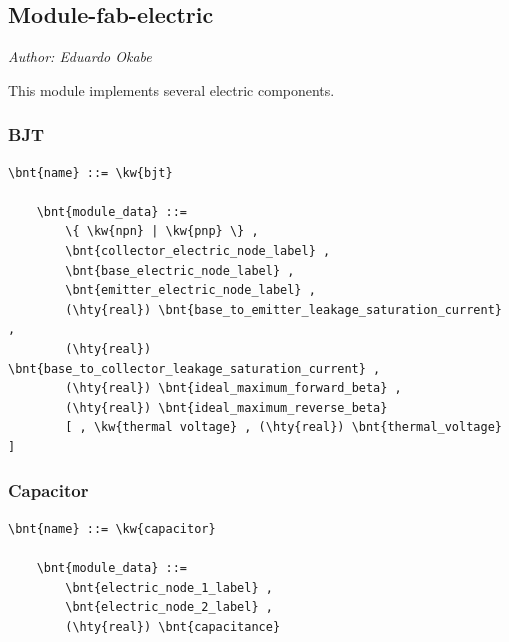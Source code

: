 % 
% 
% 
% 
% 
% 
% 
% 
% 


\subsection{Module-fab-electric}
\label{sec:MODULE:FAB-ELECTRIC}
\emph{Author: Eduardo Okabe}

\noindent
This module implements several electric components.


\subsubsection{BJT}
\begin{Verbatim}[commandchars=\\\{\}]
    \bnt{name} ::= \kw{bjt}

    \bnt{module_data} ::=
        \{ \kw{npn} | \kw{pnp} \} ,
        \bnt{collector_electric_node_label} ,
        \bnt{base_electric_node_label} ,
        \bnt{emitter_electric_node_label} ,
        (\hty{real}) \bnt{base_to_emitter_leakage_saturation_current} ,
        (\hty{real}) \bnt{base_to_collector_leakage_saturation_current} ,
        (\hty{real}) \bnt{ideal_maximum_forward_beta} ,
        (\hty{real}) \bnt{ideal_maximum_reverse_beta}
        [ , \kw{thermal voltage} , (\hty{real}) \bnt{thermal_voltage} ]
\end{Verbatim}


\subsubsection{Capacitor}
\begin{Verbatim}[commandchars=\\\{\}]
    \bnt{name} ::= \kw{capacitor}

    \bnt{module_data} ::=
        \bnt{electric_node_1_label} ,
        \bnt{electric_node_2_label} ,
        (\hty{real}) \bnt{capacitance}
\end{Verbatim}

